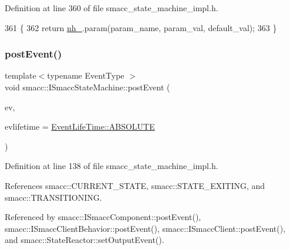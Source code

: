Definition at line 360 of file smacc\+\_\+state\+\_\+machine\+\_\+impl.\+h.


\begin{DoxyCode}
361   \{
362     \textcolor{keywordflow}{return} \hyperlink{classsmacc_1_1ISmaccStateMachine_ad8877bcca9dbb345fe72cca839c93dd3}{nh\_}.param(param\_name, param\_val, default\_val);
363   \}
\end{DoxyCode}
\mbox{\label{classsmacc_1_1ISmaccStateMachine_afcb6a216441aeaea2cba4e1ab12c366b}} 
\subsubsection{\texorpdfstring{post\+Event()}{postEvent()}\hspace{0.1cm}{\footnotesize\ttfamily [1/2]}}
{\footnotesize\ttfamily template$<$typename Event\+Type $>$ \\
void smacc\+::\+I\+Smacc\+State\+Machine\+::post\+Event (\begin{DoxyParamCaption}\item[{Event\+Type $\ast$}]{ev,  }\item[{\hyperlink{namespacesmacc_a5063f47926ad2fe25120ed4b1e7b2c7e}{Event\+Life\+Time}}]{evlifetime = {\ttfamily \hyperlink{namespacesmacc_a5063f47926ad2fe25120ed4b1e7b2c7ea3a0bc063b6db8cae0361657958be836f}{Event\+Life\+Time\+::\+A\+B\+S\+O\+L\+U\+TE}} }\end{DoxyParamCaption})}



Definition at line 138 of file smacc\+\_\+state\+\_\+machine\+\_\+impl.\+h.



References smacc\+::\+C\+U\+R\+R\+E\+N\+T\+\_\+\+S\+T\+A\+TE, smacc\+::\+S\+T\+A\+T\+E\+\_\+\+E\+X\+I\+T\+I\+NG, and smacc\+::\+T\+R\+A\+N\+S\+I\+T\+I\+O\+N\+I\+NG.



Referenced by smacc\+::\+I\+Smacc\+Component\+::post\+Event(), smacc\+::\+I\+Smacc\+Client\+Behavior\+::post\+Event(), smacc\+::\+I\+Smacc\+Client\+::post\+Event(), and smacc\+::\+State\+Reactor\+::set\+Output\+Event().



